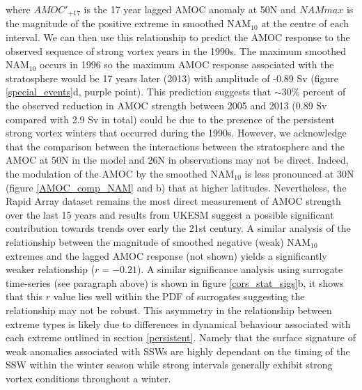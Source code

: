 where $AMOC'_{+17}$ is the 17 year lagged AMOC anomaly at 50N and $NAM max$ is the magnitude of the positive extreme in smoothed NAM$_{10}$ at the centre of each interval. We can then use this relationship to predict the AMOC response to the observed sequence of strong vortex years in the 1990s. The maximum smoothed NAM$_{10}$ occurs in 1996 so the maximum AMOC response associated with the stratosphere would be 17 years later (2013) with amplitude of -0.89 Sv (figure \ref{special_events}d, purple point). This prediction suggests that $\sim$30\% percent of the observed reduction in AMOC strength  between 2005 and 2013 (0.89 Sv compared with 2.9 Sv in total) could be due to the presence of the persistent strong vortex winters that occurred during the 1990s. However, we acknowledge that the comparison between the interactions between the stratosphere and the AMOC at 50N in the model and 26N in observations may not be direct. Indeed, the modulation of the AMOC by the smoothed NAM$_{10}$ is less pronounced at 30N (figure \ref{AMOC_comp_NAM} and b) that at higher latitudes. Nevertheless, the Rapid Array dataset remains the most direct measurement of AMOC strength over the last 15 years and results from UKESM suggest a possible significant contribution towards trends over early the 21st century.  A similar analysis of the relationship between the magnitude of smoothed negative (weak) NAM$_{10}$ extremes and the lagged AMOC response (not shown) yields a significantly weaker relationship ($r = -0.21$). A similar significance analysis using surrogate time-series (see paragraph above) is shown in figure \ref{cors_stat_sigs}b, it shows that this $r$ value lies well within the PDF of surrogates suggesting the relationship may not be robust. This asymmetry in the relationship between extreme types is likely due to differences in dynamical behaviour associated with each extreme outlined in section \ref{persistent}. Namely that the surface signature of weak anomalies associated with SSWs are highly dependant on the timing of the SSW within the winter season while strong intervals generally exhibit strong vortex conditions throughout a winter.  

